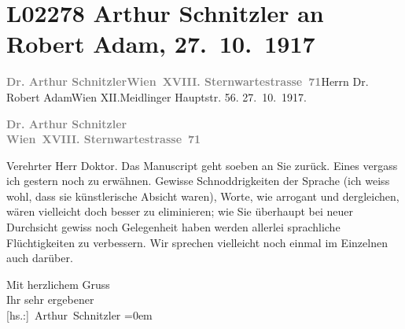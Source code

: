 

\section[Arthur Schnitzler an Robert Adam, 27. 10. 1917]{L02278 Arthur Schnitzler an Robert Adam, 27. 10. 1917}
\nopagebreak{}
\rehead{ }\normalsize\beginnumbering{}
\toendnotes[C]{\smallbreak\pagebreak[2]}
\toendnotes[C]{\smallbreak}\pstart{}{\pb}\textcolor{gray}{\textbf{Dr. Arthur Schnitzler}}\pend{}\pstart{}\textcolor{gray}{\textbf{Wien XVIII. Sternwartestrasse 71}}\pend{}{\bigskip}\pstart{}{\pb}Herrn Dr. Robert Adam\pend{}\pstart{}Wien XII.\pend{}\pstart{}Meidlinger Hauptstr. 56.\pend{}{\bigskip}\vspace{1em}
\pstart
           \raggedleft{}{\pb}27. 10. 1917.\pend
           
\pstart
           \textcolor{gray}{\textbf{Dr. Arthur Schnitzler}}{\\}\textcolor{gray}{\textbf{Wien XVIII. Sternwartestrasse 71}}\pend
           
\pstart\center{}Verehrter Herr Doktor.\pend\vspace{0.5em}
\pstart
           Das Manuscript geht soeben an
               Sie zurück. Eines vergass ich gestern noch zu erwähnen. Gewisse Schnoddrigkeiten der
               Sprache (ich weiss wohl, dass sie künstlerische Absicht waren), Worte, wie arrogant
               und dergleichen, wären vielleicht doch besser zu eliminieren; wie Sie überhaupt bei
               neuer Durchsicht gewiss noch Gelegenheit haben werden allerlei sprachliche
               Flüchtigkeiten zu verbessern. Wir sprechen vielleicht noch einmal im Einzelnen auch
               darüber.\pend
           
\pstart
           Mit herzlichem Gruss{\\[\baselineskip]}Ihr sehr ergebener{\\[\baselineskip]}\spacefill\mbox{{[}hs.:{]} Arthur Schnitzler}\pend
           \leftskip=0em{}\endnumbering{}  
      